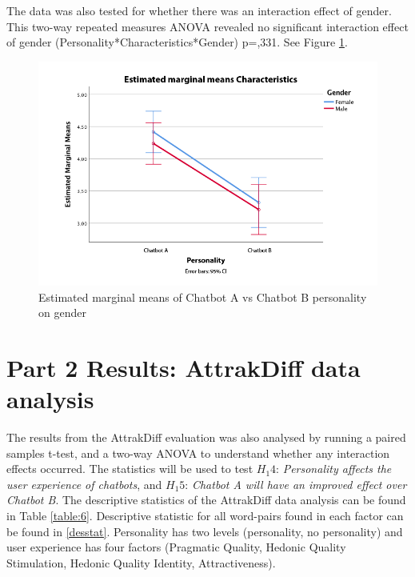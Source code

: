 The data was also tested for whether there was an interaction effect of gender. This two-way repeated measures ANOVA revealed no significant interaction effect of gender (Personality*Characteristics*Gender) p=,331. See Figure \ref{fig:perschargender}.

\begin{figure}[H]
    \centering
    \includegraphics[scale=0.4]{figures/pers-char-gender.png}
    \caption{Estimated marginal means of Chatbot A vs Chatbot B personality on gender}
    \label{fig:perschargender}
\end{figure}

\section{Part 2 Results: AttrakDiff data analysis }
        
The results from the AttrakDiff evaluation was also analysed by running a paired samples t-test, and a two-way ANOVA to understand whether any interaction effects occurred. The statistics will be used to test $H_1 4$: \textit{Personality affects the user experience of chatbots}, and $H_1 5$: \textit{Chatbot A will have an improved effect over Chatbot B}. The descriptive statistics of the AttrakDiff data analysis can be found in Table \ref{table:6}. Descriptive statistic for all word-pairs found in each factor can be found in \ref{desstat}. Personality has two levels (personality, no personality) and user experience has four factors (Pragmatic Quality, Hedonic Quality Stimulation, Hedonic Quality Identity, Attractiveness).

